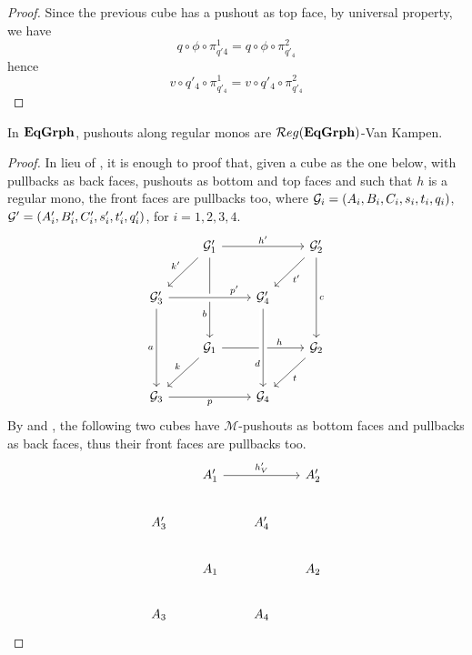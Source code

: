 \begin{proof}
	Since the previous cube has a pushout as top face, by universal property, we have
	\[
		q \circ \phi \circ \pi_{q'4}^1 = q \circ \phi \circ \pi_{q'_4}^2
	\]
	hence
	\[
		v \circ q'_4 \circ \pi_{q'_4}^1 = v \circ q'_4 \circ \pi_{q'_4}^2
	\]

\end{proof}


\begin{lemma}\label{lemma:van_kampen}
	In $\mathbf{EqGrph}$, pushouts along regular monos are $\mathcal{R}eg(\mathbf{EqGrph})$-Van Kampen.
\end{lemma}

\begin{proof}
	In lieu of , it is enough to proof that, given a cube as the one below, with pullbacks as back faces, pushouts as bottom and top faces and such that $h$ is a regular mono, the front faces are pullbacks too, where $\mathcal{G}_i = (A_i, B_i, C_i, s_i, t_i, q_i)$, $\mathcal{G}'=(A_i', B_i', C_i', s_i', t_i', q_i')$, for $i = 1, 2, 3, 4$.
        \[\begin{tikzcd}[row sep=23, column sep =23]
        & {\mathcal{G}_1'} && {\mathcal{G}_2'} \\
        {\mathcal{G}_3'} && {\mathcal{G}_4'} \\
        & {\mathcal{G}_1} && {\mathcal{G}_2} \\
        {\mathcal{G}_3} && {\mathcal{G}_4}
        \arrow["{h'}", from=1-2, to=1-4]
        \arrow["{k'}"', from=1-2, to=2-1]
        \arrow["b"'{pos=0.7}, from=1-2, to=3-2]
        \arrow["{t'}", from=1-4, to=2-3]
        \arrow["c", from=1-4, to=3-4]
        \arrow["{p'}"{pos=0.8}, from=2-1, to=2-3, crossing over]
        \arrow["a"', from=2-1, to=4-1]
        \arrow["h"{pos=0.7}, from=3-2, to=3-4]
        \arrow["d"'{pos=0.7}, from=2-3, to=4-3, crossing over]
        \arrow["k"', from=3-2, to=4-1]
        \arrow["t", from=3-4, to=4-3]
        \arrow["p"', from=4-1, to=4-3]
        \end{tikzcd}\]
        By  and , the following two cubes have $\mathcal{M}$-pushouts as bottom faces and pullbacks as back faces, thus their front faces are pullbacks too.
        \[\begin{tikzcd}[row sep=20, column sep = 20]
        & {A_1'} && {A_2'} \\
        {A_3'} && {A_4'} \\
        & {A_1} && {A_2} \\
        {A_3} && {A_4}
        \arrow["{h'_V}", from=1-2, to=1-4]

\end{tikzcd}\]
\end{proof}
